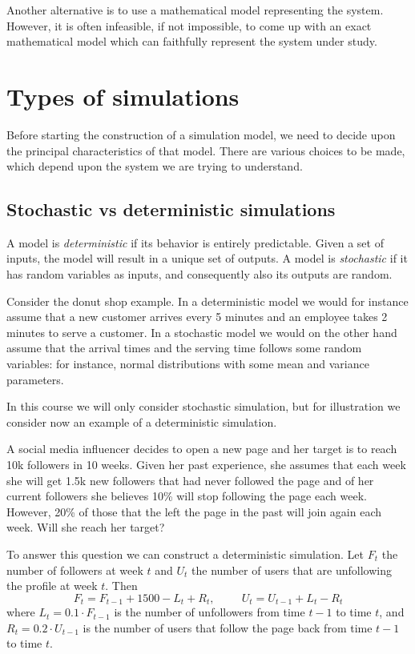 \documentclass[
]{book}
\theoremstyle{definition}
\theoremstyle{definition}
\theoremstyle{definition}
\theoremstyle{definition}
\theoremstyle{remark}
\begin{document}
Another alternative is to use a mathematical model representing the system. However, it is often infeasible, if not impossible, to come up with an exact mathematical model which can faithfully represent the system under study.

\hypertarget{types-of-simulations}{%
\section{Types of simulations}\label{types-of-simulations}}

Before starting the construction of a simulation model, we need to decide upon the principal characteristics of that model. There are various choices to be made, which depend upon the system we are trying to understand.

\hypertarget{stochastic-vs-deterministic-simulations}{%
\subsection{Stochastic vs deterministic simulations}\label{stochastic-vs-deterministic-simulations}}

A model is \emph{deterministic} if its behavior is entirely predictable. Given a set of inputs, the model will result in a unique set of outputs. A model is \emph{stochastic} if it has random variables as inputs, and consequently also its outputs are random.

Consider the donut shop example. In a deterministic model we would for instance assume that a new customer arrives every 5 minutes and an employee takes 2 minutes to serve a customer. In a stochastic model we would on the other hand assume that the arrival times and the serving time follows some random variables: for instance, normal distributions with some mean and variance parameters.

In this course we will only consider stochastic simulation, but for illustration we consider now an example of a deterministic simulation.

A social media influencer decides to open a new page and her target is to reach 10k followers in 10 weeks. Given her past experience, she assumes that each week she will get 1.5k new followers that had never followed the page and of her current followers she believes 10\% will stop following the page each week. However, 20\% of those that the left the page in the past will join again each week. Will she reach her target?

To answer this question we can construct a deterministic simulation. Let \(F_t\) the number of followers at week \(t\) and \(U_t\) the number of users that are unfollowing the profile at week \(t\). Then
\[
F_t = F_{t-1} + 1500 - L_{t} + R_{t}, \hspace{1cm} U_t= U_{t-1} + L_{t} - R_{t}
\]
where \(L_{t}=0.1\cdot F_{t-1}\) is the number of unfollowers from time \(t-1\) to time \(t\), and \(R_{t}=0.2\cdot U_{t-1}\) is the number of users that follow the page back from time \(t-1\) to time \(t\).
\end{document}
